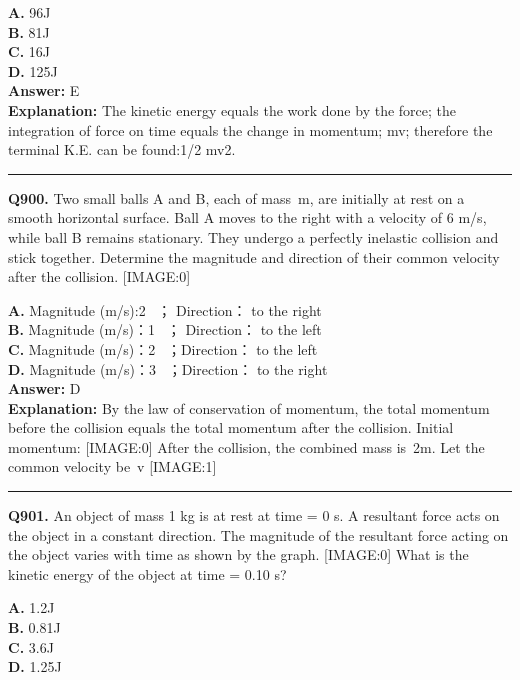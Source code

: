 \documentclass[12pt]{article}
\begin{document}
\textbf{A.} 96J \\
\textbf{B.} 81J \\
\textbf{C.} 16J \\
\textbf{D.} 125J \\

\textbf{Answer:} E \\
\textbf{Explanation:} The kinetic energy equals the work done by the force; the integration of force on time equals the change in momentum; mv; therefore the terminal K.E. can be found:1/2 mv2.

\hrule
\vspace{1em}


\noindent
\textbf{Q900.} Two small balls A and B, each of mass m, are initially at rest on a smooth horizontal surface. Ball A moves to the right with a velocity of
6
m/s, while ball B remains stationary. They undergo a perfectly inelastic collision and stick together. Determine the magnitude and direction of their common velocity after the collision.
[IMAGE:0]



\textbf{A.} Magnitude (m/s):2  ；
Direction：
to the right \\
\textbf{B.} Magnitude (m/s)：1  ；
Direction：
to the left \\
\textbf{C.} Magnitude (m/s)：2  ；Direction：
to the left \\
\textbf{D.} Magnitude (m/s)：3  ；Direction：
to the right \\

\textbf{Answer:} D \\
\textbf{Explanation:} By the law of conservation of momentum, the total momentum before the collision equals the total momentum after the collision.
Initial momentum:
[IMAGE:0]
After the collision, the combined mass is 2m. Let the common velocity be v
[IMAGE:1]

\hrule
\vspace{1em}


\noindent
\textbf{Q901.} An object of mass 1 kg is at rest at time = 0 s. A resultant force acts on the object in a constant direction.
The magnitude of the resultant force acting on the object varies with time as shown by
the graph.
[IMAGE:0]
What is the kinetic energy of the object at time = 0.10 s?



\textbf{A.} 1.2J \\
\textbf{B.} 0.81J \\
\textbf{C.} 3.6J \\
\textbf{D.} 1.25J \\
\end{document}
